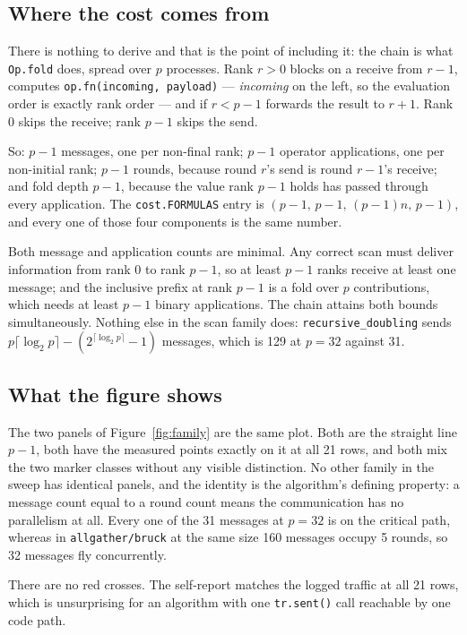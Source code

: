 \documentclass[11pt]{article}
\begin{document}
\subsection{Where the cost comes from}

There is nothing to derive and that is the point of including it: the chain is what
\texttt{Op.fold} does, spread over $p$ processes. Rank $r>0$ blocks on a receive from $r-1$,
computes \texttt{op.fn(incoming, payload)} --- \emph{incoming} on the left, so the evaluation order
is exactly rank order --- and if $r < p-1$ forwards the result to $r+1$. Rank 0 skips the receive;
rank $p-1$ skips the send.

So: $p-1$ messages, one per non-final rank; $p-1$ operator applications, one per non-initial rank;
$p-1$ rounds, because round $r$'s send is round $r-1$'s receive; and fold depth $p-1$, because the
value rank $p-1$ holds has passed through every application. The \texttt{cost.FORMULAS} entry is
$(p-1,\, p-1,\, (p-1)n,\, p-1)$, and every one of those four components is the same number.

Both message and application counts are minimal. Any correct scan must deliver information from
rank $0$ to rank $p-1$, so at least $p-1$ ranks receive at least one message; and the inclusive
prefix at rank $p-1$ is a fold over $p$ contributions, which needs at least $p-1$ binary
applications. The chain attains both bounds simultaneously. Nothing else in the scan family does:
\texttt{recursive\_doubling} sends $p\lceil\log_2 p\rceil - (2^{\lceil\log_2 p\rceil}-1)$ messages,
which is 129 at $p=32$ against 31.

\subsection{What the figure shows}

The two panels of Figure~\ref{fig:family} are the same plot. Both are the straight line $p-1$,
both have the measured points exactly on it at all 21 rows, and both mix the two marker classes
without any visible distinction. No other family in the sweep has identical panels, and the
identity is the algorithm's defining property: a message count equal to a round count means the
communication has no parallelism at all. Every one of the 31 messages at $p=32$ is on the critical
path, whereas in \texttt{allgather/bruck} at the same size 160 messages occupy 5 rounds, so 32
messages fly concurrently.

There are no red crosses. The self-report matches the logged traffic at all 21 rows, which is
unsurprising for an algorithm with one \texttt{tr.sent()} call reachable by one code path.
\end{document}
